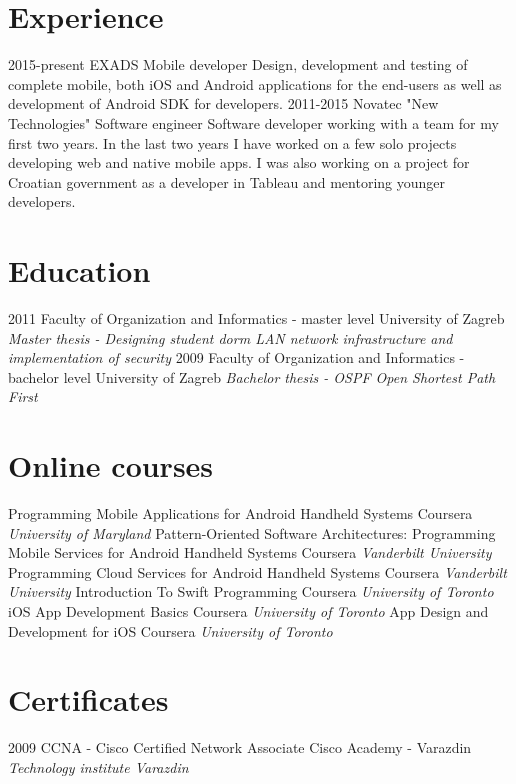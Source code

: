 \documentclass[print]{cv}
\begin{document}
\section{Experience}
\begin{entrylist}
	\entry
	{2015-present}
	{EXADS}
	{Mobile developer}
	{Design, development and testing of complete mobile, both iOS and Android applications for the end-users as well as development of Android SDK for developers.}
	\entry
	{2011-2015}
	{Novatec "New Technologies"}
	{Software engineer}
	{Software developer working with a team for my first two years. In the last two years I have worked on a few solo projects developing web and native mobile apps. I was also working on a project for Croatian government as a developer in Tableau and mentoring younger developers.}
\end{entrylist}



\section{Education}
\begin{entrylist}
	\entry
	{2011}
	{Faculty of Organization and Informatics - master level}
	{University of Zagreb}
	{\emph{Master thesis - Designing student dorm LAN network infrastructure and implementation of security}}
	\entry
	{2009}
	{Faculty of Organization and Informatics - bachelor level}
	{University of Zagreb}
	{\emph{Bachelor thesis - OSPF Open Shortest Path First}}
\end{entrylist}



\section{Online courses}
\begin{entrylist}
	\entry
	{} 
	{Programming Mobile Applications for Android Handheld Systems}
	{Coursera}
	{\emph{University of Maryland}}
	\entry
	{}
	{Pattern-Oriented Software Architectures: Programming Mobile Services for Android Handheld Systems}
	{Coursera}
	{\emph{Vanderbilt University}}
	\entry
	{}
	{Programming Cloud Services for Android Handheld Systems} 
	{Coursera}
	{\emph{Vanderbilt University}}
	\entry
	{} 
	{Introduction To Swift Programming}
	{Coursera}
	{\emph{University of Toronto}}
	\entry
	{}
	{iOS App Development Basics}
	{Coursera}
	{\emph{University of Toronto}}
	\entry
	{}
	{App Design and Development for iOS} 
	{Coursera}
	{\emph{University of Toronto}}
\end{entrylist}



\section{Certificates}
\begin{entrylist}
	\entry
	{2009} 
	{CCNA - Cisco Certified Network Associate}
	{Cisco Academy - Varazdin}
	{\emph{Technology institute Varazdin}}
\end{entrylist}
\end{document}
